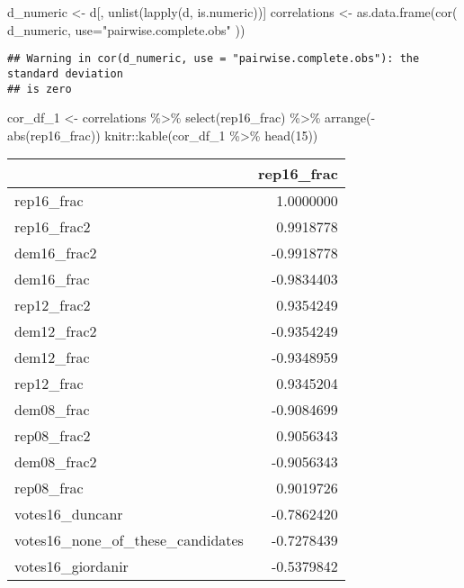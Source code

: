 \documentclass[
]{article}
\newenvironment{Shaded}{\begin{snugshade}}{\end{snugshade}}
\newcommand{\AttributeTok}[1]{\textcolor[rgb]{0.77,0.63,0.00}{#1}}
\newcommand{\DecValTok}[1]{\textcolor[rgb]{0.00,0.00,0.81}{#1}}
\newcommand{\FunctionTok}[1]{\textcolor[rgb]{0.00,0.00,0.00}{#1}}
\newcommand{\NormalTok}[1]{#1}
\newcommand{\OtherTok}[1]{\textcolor[rgb]{0.56,0.35,0.01}{#1}}
\newcommand{\SpecialCharTok}[1]{\textcolor[rgb]{0.00,0.00,0.00}{#1}}
\newcommand{\StringTok}[1]{\textcolor[rgb]{0.31,0.60,0.02}{#1}}
\begin{document}
\begin{Shaded}
\begin{Highlighting}[]
\NormalTok{d\_numeric }\OtherTok{\textless{}{-}}\NormalTok{ d[, }\FunctionTok{unlist}\NormalTok{(}\FunctionTok{lapply}\NormalTok{(d, is.numeric))]}
\NormalTok{correlations }\OtherTok{\textless{}{-}} \FunctionTok{as.data.frame}\NormalTok{(}\FunctionTok{cor}\NormalTok{(}
\NormalTok{  d\_numeric, }\AttributeTok{use=}\StringTok{"pairwise.complete.obs"}
\NormalTok{))}
\end{Highlighting}
\end{Shaded}

\begin{verbatim}
## Warning in cor(d_numeric, use = "pairwise.complete.obs"): the standard deviation
## is zero
\end{verbatim}

\begin{Shaded}
\begin{Highlighting}[]
\NormalTok{cor\_df\_1 }\OtherTok{\textless{}{-}}\NormalTok{ correlations }\SpecialCharTok{\%\textgreater{}\%} 
  \FunctionTok{select}\NormalTok{(rep16\_frac) }\SpecialCharTok{\%\textgreater{}\%}
  \FunctionTok{arrange}\NormalTok{(}\SpecialCharTok{{-}}\FunctionTok{abs}\NormalTok{(rep16\_frac))}
\NormalTok{knitr}\SpecialCharTok{::}\FunctionTok{kable}\NormalTok{(cor\_df\_1 }\SpecialCharTok{\%\textgreater{}\%} \FunctionTok{head}\NormalTok{(}\DecValTok{15}\NormalTok{))}
\end{Highlighting}
\end{Shaded}

\begin{longtable}[]{@{}lr@{}}
\toprule
& rep16\_frac \\
\midrule
\endhead
rep16\_frac & 1.0000000 \\
rep16\_frac2 & 0.9918778 \\
dem16\_frac2 & -0.9918778 \\
dem16\_frac & -0.9834403 \\
rep12\_frac2 & 0.9354249 \\
dem12\_frac2 & -0.9354249 \\
dem12\_frac & -0.9348959 \\
rep12\_frac & 0.9345204 \\
dem08\_frac & -0.9084699 \\
rep08\_frac2 & 0.9056343 \\
dem08\_frac2 & -0.9056343 \\
rep08\_frac & 0.9019726 \\
votes16\_duncanr & -0.7862420 \\
votes16\_none\_of\_these\_candidates & -0.7278439 \\
votes16\_giordanir & -0.5379842 \\
\bottomrule
\end{longtable}
\end{document}
